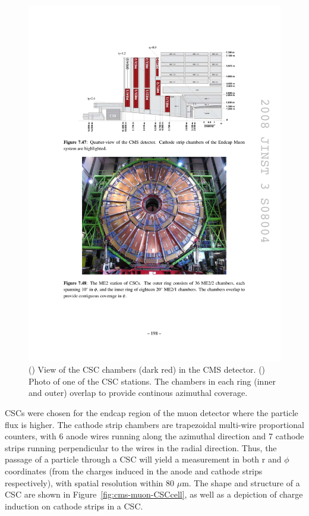 \begin{figure}[hbtp]
\begin{center}
    \includegraphics[width=1.24\cmsFigWidth]{figures/cms-muon-CSCchambers}
    \caption{(\cmsLeft) View of the CSC chambers (dark red) in the CMS detector. (\cmsRight) Photo of one of the CSC stations. The chambers in each ring (inner and outer) overlap to provide continous azimuthal coverage.~\cite{1748-0221-3-08-S08004}}
    \label{fig:cms-muon-CSClayout}
  \end{center}
\end{figure}

CSCs were chosen for the endcap region of the muon detector where the particle flux is higher. The cathode strip chambers are trapezoidal multi-wire proportional counters, with 6 anode wires running along the azimuthal direction and 7 cathode strips running perpendicular to the wires in the radial direction. Thus, the passage of a particle through a CSC will yield a measurement in both r and $\phi$ coordinates (from the charges induced in the anode and cathode strips respectively), with spatial resolution within 80 $\mu$m. The shape and structure of a CSC are shown in Figure~\ref{fig:cms-muon-CSCcell}, as well as a depiction of charge induction on cathode strips in a CSC.

